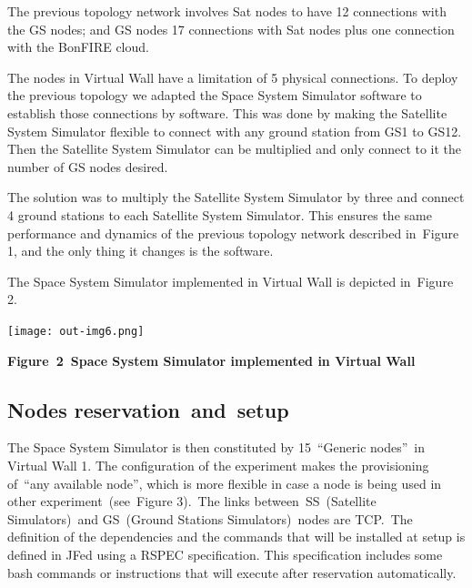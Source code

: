 \documentclass[a4paper]{article}
\begin{document}
\bigskip

The previous topology network involves Sat nodes to have 12 connections
with the GS nodes; and GS nodes 17 connections with Sat nodes plus one
connection with the BonFIRE cloud.


\bigskip

The nodes in Virtual Wall have a limitation of 5 physical connections.
To deploy the previous topology we adapted the Space System Simulator
software to establish those connections by software. This was done by
making the Satellite System Simulator flexible to connect with any
ground station from GS1 to GS12. Then the Satellite System Simulator
can be multiplied and only connect to it the number of GS nodes
desired.\ 


\bigskip

The solution was to multiply the Satellite System Simulator by three and
connect 4 ground stations to each Satellite System Simulator. This
ensures the same performance and dynamics of the previous topology
network described in\ Figure 1, and the only thing it changes is the
software.


\bigskip

The Space System Simulator implemented in Virtual Wall is depicted
in\ Figure 2.

{\centering 
\texttt{[image: out-img6.png]} \par}

{\centering\bfseries
\label{bkm:Ref390072850}Figure\ 2\ Space System Simulator implemented in
Virtual Wall
\par}


\bigskip

\subsection[Nodes reservation\ and\ setup]{Nodes
reservation\ and\ setup}
\hypertarget{Toc390097012}{}The Space System Simulator is then
constituted by 15\ {\textquotedblleft}Generic
nodes{\textquotedblright}\ in Virtual Wall 1. The configuration of the
experiment makes the provisioning of\ {\textquotedblleft}any available
node{\textquotedblright}, which is more flexible in case a node is
being used in other experiment\ (see\ Figure 3).\ The links
between\ SS\ (Satellite Simulators)\ and GS\ (Ground Stations
Simulators)\ nodes are TCP.\ The definition of the dependencies and the
commands that will be installed at setup is defined in JFed using a
RSPEC specification. This specification includes some bash commands or
instructions that will execute after reservation automatically.
\end{document}
